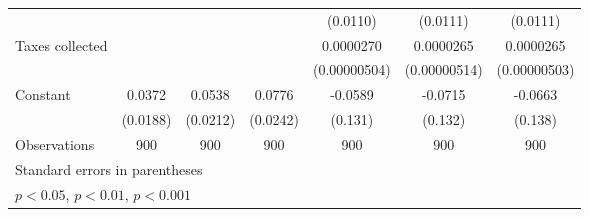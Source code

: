 {\begin{tabular}{l*{6}{c}}
                    &                     &                     &                     &    (0.0110)         &    (0.0111)         &    (0.0111)         \\
[1em]
Taxes collected     &                     &                     &                     &   0.0000270\sym{***}&   0.0000265\sym{***}&   0.0000265\sym{***}\\
                    &                     &                     &                     &(0.00000504)         &(0.00000514)         &(0.00000503)         \\
[1em]
Constant            &      0.0372         &      0.0538\sym{*}  &      0.0776\sym{**} &     -0.0589         &     -0.0715         &     -0.0663         \\
                    &    (0.0188)         &    (0.0212)         &    (0.0242)         &     (0.131)         &     (0.132)         &     (0.138)         \\
\hline
Observations        &         900         &         900         &         900         &         900         &         900         &         900         \\
\hline\hline
\multicolumn{7}{l}{\footnotesize Standard errors in parentheses}\\
\multicolumn{7}{l}{\footnotesize \sym{*} \(p<0.05\), \sym{**} \(p<0.01\), \sym{***} \(p<0.001\)}\\
\end{tabular}
}
